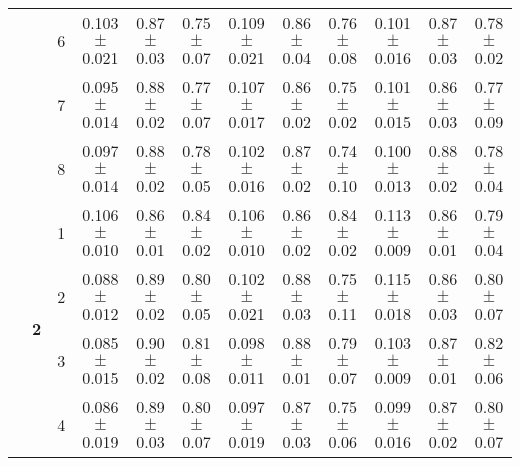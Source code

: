 \begin{table*}
{\begin{tabular}{|l|c|c||c|c|c||c|c|c||c|c|c|}
 & & 6 & \textcolor{gate_color}{0.103$\pm$0.021} & \textcolor{gate_color}{0.87$\pm$0.03} & \textcolor{gate_color}{0.75$\pm$0.07} & \textcolor{mixed_color}{0.109$\pm$0.021} & \textcolor{mixed_color}{0.86$\pm$0.04} & \textcolor{mixed_color}{0.76$\pm$0.08} & \textcolor{pulsed_color}{0.101$\pm$0.016} & \textcolor{pulsed_color}{0.87$\pm$0.03} & \textcolor{pulsed_color}{0.78$\pm$0.02} \\
 & & 7 & \textcolor{gate_color}{0.095$\pm$0.014} & \textcolor{gate_color}{0.88$\pm$0.02} & \textcolor{gate_color}{0.77$\pm$0.07} & \textcolor{mixed_color}{0.107$\pm$0.017} & \textcolor{mixed_color}{0.86$\pm$0.02} & \textcolor{mixed_color}{0.75$\pm$0.02} & \textcolor{pulsed_color}{0.101$\pm$0.015} & \textcolor{pulsed_color}{0.86$\pm$0.03} & \textcolor{pulsed_color}{0.77$\pm$0.09} \\
 & & 8 & \textcolor{gate_color}{0.097$\pm$0.014} & \textcolor{gate_color}{0.88$\pm$0.02} & \textcolor{gate_color}{0.78$\pm$0.05} & \textcolor{mixed_color}{0.102$\pm$0.016} & \textcolor{mixed_color}{0.87$\pm$0.02} & \textcolor{mixed_color}{0.74$\pm$0.10} & \textcolor{pulsed_color}{0.100$\pm$0.013} & \textcolor{pulsed_color}{0.88$\pm$0.02} & \textcolor{pulsed_color}{0.78$\pm$0.04} \\
\cline{2-12}
 & \multirow{8}{*}{\textbf{2}} & 1 & \textcolor{gate_color}{0.106$\pm$0.010} & \textcolor{gate_color}{0.86$\pm$0.01} & \textcolor{gate_color}{0.84$\pm$0.02} & \textcolor{mixed_color}{0.106$\pm$0.010} & \textcolor{mixed_color}{0.86$\pm$0.02} & \textcolor{mixed_color}{0.84$\pm$0.02} & \textcolor{pulsed_color}{0.113$\pm$0.009} & \textcolor{pulsed_color}{0.86$\pm$0.01} & \textcolor{pulsed_color}{0.79$\pm$0.04} \\
 & & 2 & \textcolor{gate_color}{0.088$\pm$0.012} & \textcolor{gate_color}{0.89$\pm$0.02} & \textcolor{gate_color}{0.80$\pm$0.05} & \textcolor{mixed_color}{0.102$\pm$0.021} & \textcolor{mixed_color}{0.88$\pm$0.03} & \textcolor{mixed_color}{0.75$\pm$0.11} & \textcolor{pulsed_color}{0.115$\pm$0.018} & \textcolor{pulsed_color}{0.86$\pm$0.03} & \textcolor{pulsed_color}{0.80$\pm$0.07} \\
 & & 3 & \textcolor{gate_color}{0.085$\pm$0.015} & \textcolor{gate_color}{0.90$\pm$0.02} & \textcolor{gate_color}{0.81$\pm$0.08} & \textcolor{mixed_color}{0.098$\pm$0.011} & \textcolor{mixed_color}{0.88$\pm$0.01} & \textcolor{mixed_color}{0.79$\pm$0.07} & \textcolor{pulsed_color}{0.103$\pm$0.009} & \textcolor{pulsed_color}{0.87$\pm$0.01} & \textcolor{pulsed_color}{0.82$\pm$0.06} \\
 & & 4 & \textcolor{gate_color}{0.086$\pm$0.019} & \textcolor{gate_color}{0.89$\pm$0.03} & \textcolor{gate_color}{0.80$\pm$0.07} & \textcolor{mixed_color}{0.097$\pm$0.019} & \textcolor{mixed_color}{0.87$\pm$0.03} & \textcolor{mixed_color}{0.75$\pm$0.06} & \textcolor{pulsed_color}{0.099$\pm$0.016} & \textcolor{pulsed_color}{0.87$\pm$0.02} & \textcolor{pulsed_color}{0.80$\pm$0.07} \\

\end{tabular}}
\end{table*}
